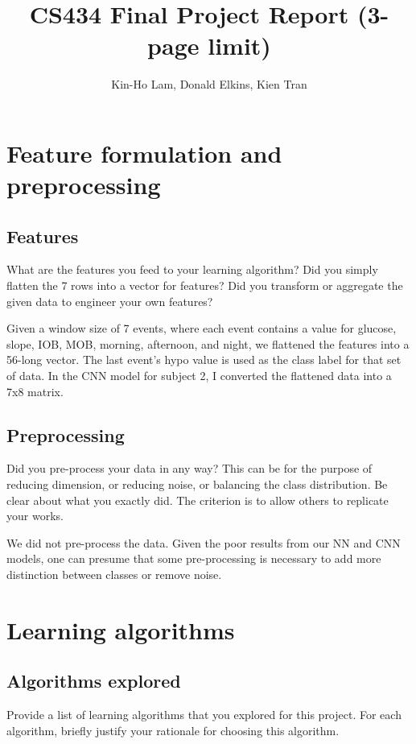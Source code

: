 \documentclass[11pt,a4paper]{article}
\title{CS434 Final Project Report (3-page limit)}
\author{Kin-Ho Lam, Donald Elkins, Kien Tran}
\date{}
\begin{document}
\maketitle
\section{Feature formulation and preprocessing}
\subsection{Features} What are the features you feed to your learning algorithm? Did you simply flatten the 7 rows into a vector for features? Did you transform or aggregate the given data to engineer your own features?

Given a window size of 7 events, where each event contains a value for glucose, slope, IOB, MOB, morning, afternoon, and night, we flattened the features into a 56-long vector.
The last event's hypo value is used as the class label for that set of data.
In the CNN model for subject 2, I converted the flattened data into a 7x8 matrix.

\subsection{Preprocessing}
Did you pre-process your data in any way? This can be for the purpose of reducing dimension, or reducing noise, or balancing the class distribution. Be clear about what you exactly did. The criterion is to allow others to replicate your works.

We did not pre-process the data.
Given the poor results from our NN and CNN models, one can presume that some pre-processing is necessary to add more distinction between classes or remove noise.

\section{Learning algorithms}
\subsection{Algorithms explored}
Provide a list of learning algorithms that you explored for this project. For each algorithm, briefly justify your rationale for choosing this algorithm.
\end{document}
